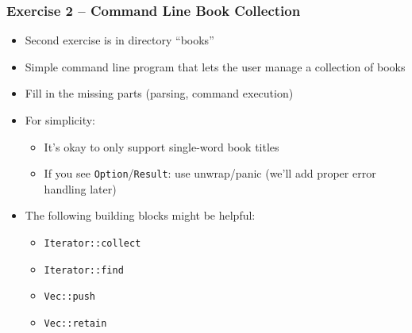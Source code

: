 \begin{frame}[fragile]
    \frametitle{Exercise 2 -- Command Line Book Collection}

    \begin{itemize}
        \item Second exercise is in directory ``books''
        \item Simple command line program that lets the user manage a collection of books
        \item Fill in the missing parts (parsing, command execution)
        \item For simplicity:
        \begin{itemize}
            \item It's okay to only support single-word book titles
            \item If you see \texttt{Option}/\texttt{Result}: use unwrap/panic (we'll add proper error handling later)
        \end{itemize}
        \item The following building blocks might be helpful:
        \begin{itemize}
            \item \texttt{Iterator::collect}
            \item \texttt{Iterator::find}
            \item \texttt{Vec::push}
            \item \texttt{Vec::retain}
        \end{itemize}
    \end{itemize}
\end{frame}
